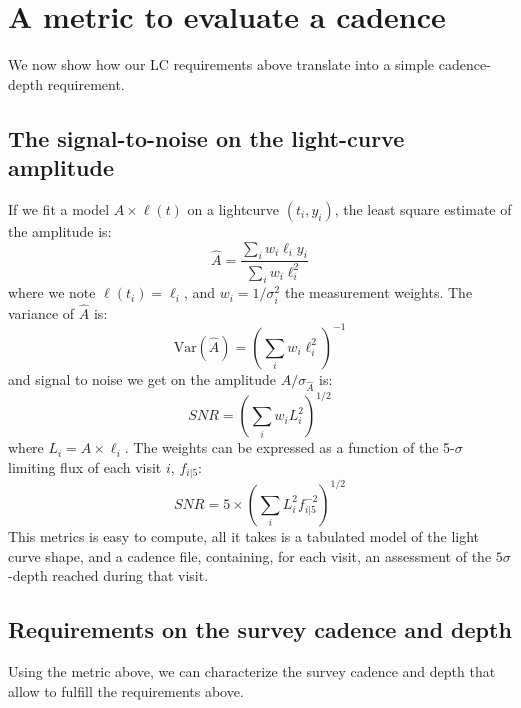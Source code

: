 \documentclass[\docopts]{\docclass}
\begin{document}



\section{A metric to evaluate a cadence}
\label{sec:metric}

We now show how our LC requirements above translate into a simple
cadence-depth requirement.


\subsection{The signal-to-noise on the light-curve amplitude}

If we fit a model $A \times \ell(t)$ on a lightcurve $(t_i, y_i)$, the
least square estimate of the amplitude is:
\begin{equation}
  \hat{A} = \frac{\sum_i w_i \ell_i y_i}{\sum_i w_i \ell^2_i}
\end{equation}
where we note $\ell(t_i) = \ell_i$, and $w_i = 1 / \sigma_i^2$ the
measurement weights. The variance of $\hat{A}$ is:
\begin{equation}
  \mathrm{Var}(\hat{A}) = \left(\sum_i w_i \ell^2_i\right)^{-1}
\end{equation}
and signal to noise we get on the amplitude $\hat{A} /
\sigma_{\hat{A}}$ is:
\begin{equation}
  SNR = \left(\sum_i w_i L^2_i\right)^{1/2}
\end{equation}
where $L_i = A \times \ell_i$.  The weights can be expressed as a
function of the 5-$\sigma$ limiting flux of each visit $i$, $f_{i|5}$:
\begin{equation}
  SNR = 5 \times \left(\sum_i L^2_i f^{-2}_{i|5}\right)^{1/2}
\end{equation}
This metrics is easy to compute, all it takes is a tabulated model of
the light curve shape, and a cadence file, containing, for each visit,
an assessment of the $5\sigma$-depth reached during that visit. 


\subsection{Requirements on the survey cadence and depth}

Using the metric above, we can characterize the survey cadence and
depth that allow to fulfill the requirements above.
\end{document}
